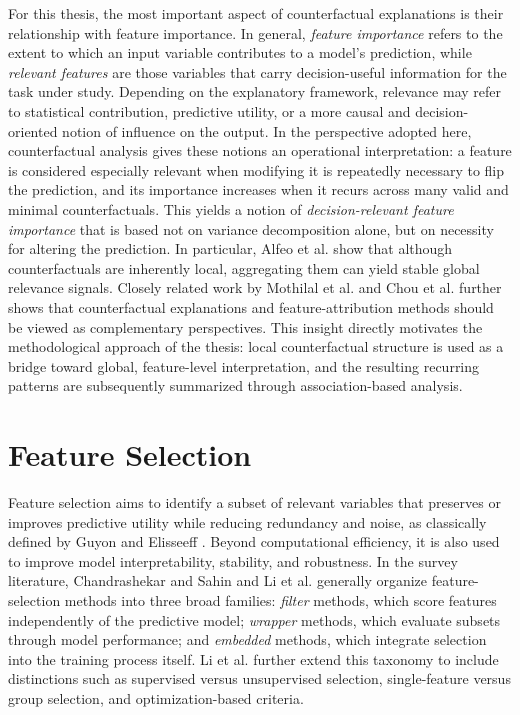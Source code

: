 For this thesis, the most important aspect of counterfactual explanations is their relationship with feature importance. In general, \emph{feature importance} refers to the extent to which an input variable contributes to a model's prediction, while \emph{relevant features} are those variables that carry decision-useful information for the task under study. Depending on the explanatory framework, relevance may refer to statistical contribution, predictive utility, or a more causal and decision-oriented notion of influence on the output. In the perspective adopted here, counterfactual analysis gives these notions an operational interpretation: a feature is considered especially relevant when modifying it is repeatedly necessary to flip the prediction, and its importance increases when it recurs across many valid and minimal counterfactuals. This yields a notion of \emph{decision-relevant feature importance} that is based not on variance decomposition alone, but on necessity for altering the prediction. In particular, Alfeo et al. \cite{alfeo2023bocsor} show that although counterfactuals are inherently local, aggregating them can yield stable global relevance signals. Closely related work by Mothilal et al. \cite{mothilal2021explaining} and Chou et al. \cite{chou2022counterfactuals} further shows that counterfactual explanations and feature-attribution methods should be viewed as complementary perspectives. This insight directly motivates the methodological approach of the thesis: local counterfactual structure is used as a bridge toward global, feature-level interpretation, and the resulting recurring patterns are subsequently summarized through association-based analysis.

\section{Feature Selection}
Feature selection aims to identify a subset of relevant variables that preserves or improves predictive utility while reducing redundancy and noise, as classically defined by Guyon and Elisseeff \cite{guyon2003introduction}. Beyond computational efficiency, it is also used to improve model interpretability, stability, and robustness. In the survey literature, Chandrashekar and Sahin \cite{chandrashekar2014survey} and Li et al. \cite{li2017feature} generally organize feature-selection methods into three broad families: \emph{filter} methods, which score features independently of the predictive model; \emph{wrapper} methods, which evaluate subsets through model performance; and \emph{embedded} methods, which integrate selection into the training process itself. Li et al. \cite{li2017feature} further extend this taxonomy to include distinctions such as supervised versus unsupervised selection, single-feature versus group selection, and optimization-based criteria.

